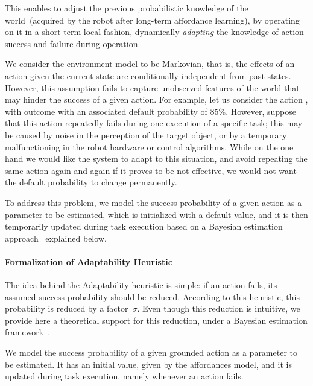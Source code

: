 This enables to adjust the previous probabilistic knowledge of the world~(acquired by the robot after long-term affordance learning), by operating on it in a short-term local fashion, dynamically \emph{adapting} the knowledge of action success and failure during operation.

We consider the environment model to be Markovian, that is, the effects of an action given the current state are conditionally independent from past states.
However, this assumption fails to capture unobserved features of the world that may hinder the success of a given action.
For example, let us consider the action
,
with outcome  with an associated default probability of 85\%.
However, suppose that this action repeatedly fails during one execution of a specific task; this may be caused by noise in the perception of the target object, or by a temporary malfunctioning in the robot hardware or control algorithms.
While on the one hand we would like the system to adapt to this situation, and avoid repeating the same action again and again if it proves to be not effective, we would not want the default probability to change permanently.

To address this problem, we model the success probability of a given action as a parameter to be estimated, which is initialized with a default value, and it is then temporarily updated during task execution based on a Bayesian estimation approach~\cite{pearl:1988:probabilistic} explained below.

\paragraph{Formalization of Adaptability Heuristic}
\label{heu:adaptability_formalization}

The idea behind the Adaptability heuristic is simple: if an action fails, its assumed success probability should be reduced. According to this heuristic, this probability is reduced by a factor~$\sigma$. Even though this reduction is intuitive, we provide here a theoretical support for this reduction, under a Bayesian estimation framework~\cite{pearl:1988:probabilistic}.

We model the success probability of a given grounded action as a parameter to be estimated. It has an initial value, given by the affordances model, and it is updated during task execution, namely whenever an action fails.

